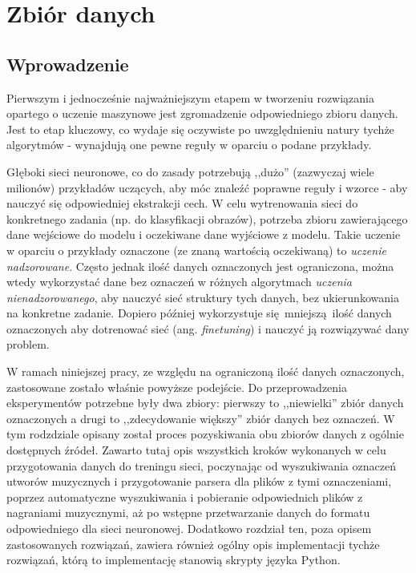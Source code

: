 \chapter{Zbiór danych}

\section{Wprowadzenie}

Pierwszym i jednocześnie najważniejszym etapem w tworzeniu rozwiązania opartego o uczenie maszynowe
jest zgromadzenie odpowiedniego zbioru danych. Jest to etap kluczowy, co wydaje się oczywiste po
uwzględnieniu natury tychże algorytmów - wynajdują one pewne reguły w oparciu o podane przykłady.

Głęboki sieci neuronowe, co do zasady potrzebują ,,dużo'' (zazwyczaj wiele milionów) przykładów
uczących, aby móc znaleźć poprawne reguły i wzorce - aby nauczyć się odpowiedniej ekstrakcji cech. W
celu wytrenowania sieci do konkretnego zadania (np. do klasyfikacji obrazów), potrzeba zbioru
zawierającego dane wejściowe do modelu i oczekiwane dane wyjściowe z modelu. Takie uczenie w oparciu
o przykłady oznaczone (ze znaną wartością oczekiwaną) to \emph{uczenie nadzorowane}. Często jednak
ilość danych oznaczonych jest ograniczona, można wtedy wykorzystać dane bez oznaczeń w różnych
algorytmach \emph{uczenia nienadzorowanego}, aby nauczyć sieć struktury tych danych, bez
ukierunkowania na konkretne zadanie. Dopiero później wykorzystuje się mniejszą ilość danych
oznaczonych aby dotrenować sieć (ang. \emph{finetuning}) i nauczyć ją rozwiązywać dany problem.

W ramach niniejszej pracy, ze względu na ograniczoną ilość danych oznaczonych, zastosowane zostało
właśnie powyższe podejście. Do przeprowadzenia eksperymentów potrzebne były dwa zbiory: pierwszy to
,,niewielki'' zbiór danych oznaczonych a drugi to ,,zdecydowanie większy'' zbiór danych bez
oznaczeń. W tym rodzdziale opisany został proces pozyskiwania obu zbiorów danych z ogólnie
dostępnych źródeł. Zawarto tutaj opis wszystkich kroków wykonanych w celu przygotowania danych do
treningu sieci, poczynając od wyszukiwania oznaczeń utworów muzycznych i przygotowanie parsera dla
plików z tymi oznaczeniami, poprzez automatyczne wyszukiwania i pobieranie odpowiednich plików z
nagraniami muzycznymi, aż po wstępne przetwarzanie danych do formatu odpowiedniego dla sieci
neuronowej. Dodatkowo rozdział ten, poza opisem zastosowanych rozwiązań, zawiera również ogólny opis
implementacji tychże rozwiązań, którą to implementację stanowią skrypty języka Python.

